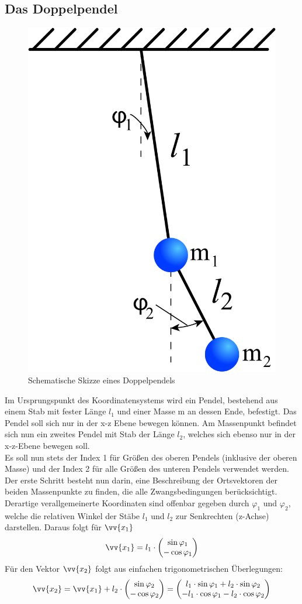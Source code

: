 \subsection{Das Doppelpendel}
\begin{figure}
	\centering
	\includegraphics[width=.3\textwidth]{images/double-pendulum.png}
	\caption{Schematische Skizze eines Doppelpendels}
	\label{wiki:double-pendulum}
\end{figure}
Im Ursprungspunkt des Koordinatensystems wird ein Pendel, bestehend aus einem Stab mit fester Länge $l_1$ und einer Masse m an dessen Ende, befestigt. Das Pendel soll sich nur in der x-z Ebene bewegen können. Am Massenpunkt befindet sich nun ein zweites Pendel mit Stab der Länge $l_2$, welches sich ebenso nur in der x-z-Ebene bewegen soll. \\Es soll nun stets der Index 1 für Größen des oberen Pendels (inklusive der oberen Masse) und der Index 2 für alle Größen des unteren Pendels verwendet werden. \\
Der erste Schritt besteht nun darin, eine Beschreibung der Ortsvektoren der beiden Massenpunkte zu finden, die alle Zwangsbedingungen berücksichtigt. 
Derartige verallgemeinerte Koordinaten sind offenbar gegeben durch $ \varphi_1 $ und $ \varphi_2 $, welche die relativen Winkel der Stäbe $l_1 $ und $l_2$ zur Senkrechten (z-Achse) darstellen. Daraus folgt für $ \vv{x_1} $
\begin{equation}
\vv{x_1}= l_1\cdot\begin{pmatrix}
\sin \varphi_1 \\ -\cos \varphi_1
\end{pmatrix}
\end{equation}
Für den Vektor $\vv{x_2}$ folgt aus einfachen trigonometrischen Überlegungen:
\begin{equation}
\vv{x_2}= \vv{x_1} + l_2 \cdot \begin{pmatrix}
\sin \varphi_2 \\ -\cos \varphi_2
\end{pmatrix}
= \begin{pmatrix}
l_1 \cdot \sin \varphi_1 + l_2 \cdot \sin \varphi_2 \\ - l_1 \cdot \cos \varphi_1 - l_2 \cdot \cos \varphi_2
\end{pmatrix}
\end{equation}
